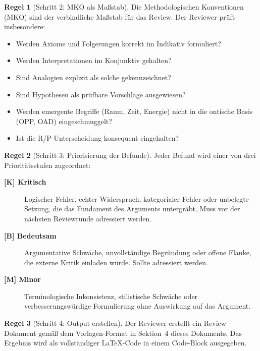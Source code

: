 \documentclass[11pt,a4paper]{article}
\theoremstyle{definition}
\newtheorem{regel}{Regel}[section]
\begin{document}
\begin{regel}[Schritt 2: MKO als Ma\ss{}stab]
Die Methodologischen Konventionen (MKO) sind der verbindliche Ma\ss{}stab f\"{u}r das
Review. Der Reviewer pr\"{u}ft insbesondere:
\begin{itemize}
  \item Werden Axiome und Folgerungen korrekt im Indikativ formuliert?
  \item Werden Interpretationen im Konjunktiv gehalten?
  \item Sind Analogien explizit als solche gekennzeichnet?
  \item Sind Hypothesen als pr\"{u}fbare Vorschl\"{a}ge ausgewiesen?
  \item Werden emergente Begriffe (Raum, Zeit, Energie) nicht in die ontische Basis
        (OPP, OAD) eingeschmuggelt?
  \item Ist die R/P-Unterscheidung konsequent eingehalten?
\end{itemize}
\end{regel}

\begin{regel}[Schritt 3: Priorisierung der Befunde]
Jeder Befund wird einer von drei Priorit\"{a}tsstufen zugeordnet:

\begin{description}
  \item[\textbf{[K] Kritisch}] Logischer Fehler, echter Widerspruch, kategorialer
        Fehler oder unbelegte Setzung, die das Fundament des Arguments untergr\"{a}bt.
        Muss vor der n\"{a}chsten Reviewrunde adressiert werden.
  \item[\textbf{[B] Bedeutsam}] Argumentative Schw\"{a}che, unvollst\"{a}ndige
        Begr\"{u}ndung oder offene Flanke, die externe Kritik einladen w\"{u}rde.
        Sollte adressiert werden.
  \item[\textbf{[M] Minor}] Terminologische Inkonsistenz, stilistische Schwäche oder
        verbesserungsw\"{u}rdige Formulierung ohne Auswirkung auf das Argument.
\end{description}
\end{regel}

\begin{regel}[Schritt 4: Output erstellen]
Der Reviewer erstellt ein Review-Dokument gem\"{a}\ss{} dem Vorlagen-Format in Sektion~4
dieses Dokuments. Das Ergebnis wird als vollst\"{a}ndiger LaTeX-Code in einem Code-Block
ausgegeben.
\end{regel}

\end{document}
